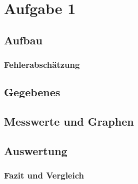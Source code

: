 \section{Aufgabe 1}
\subsection{Aufbau}
\subsubsection{Fehlerabschätzung}
\subsection{Gegebenes}
\subsection{Messwerte und Graphen}
\subsection{Auswertung}
\subsubsection{Fazit und Vergleich}